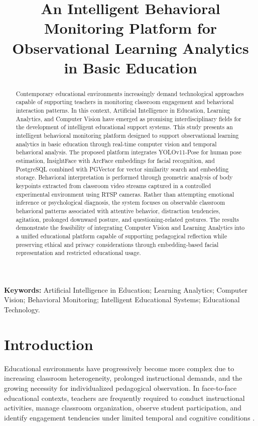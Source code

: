 \documentclass[12pt,a4paper]{article}
\title{An Intelligent Behavioral Monitoring Platform for Observational Learning Analytics in Basic Education}
\author{}
\date{}
\begin{document}
\maketitle

\begin{abstract}
Contemporary educational environments increasingly demand technological approaches capable of supporting teachers in monitoring classroom engagement and behavioral interaction patterns. In this context, Artificial Intelligence in Education, Learning Analytics, and Computer Vision have emerged as promising interdisciplinary fields for the development of intelligent educational support systems. This study presents an intelligent behavioral monitoring platform designed to support observational learning analytics in basic education through real-time computer vision and temporal behavioral analysis. The proposed platform integrates YOLOv11-Pose \cite{zhuCsbyoloRapidEfficient2024} for human pose estimation, InsightFace with ArcFace embeddings for facial recognition, and PostgreSQL combined with PGVector for vector similarity search and embedding storage. Behavioral interpretation is performed through geometric analysis of body keypoints extracted from classroom video streams captured in a controlled experimental environment using RTSP cameras. Rather than attempting emotional inference or psychological diagnosis, the system focuses on observable classroom behavioral patterns associated with attentive behavior, distraction tendencies, agitation, prolonged downward posture, and questioning-related gestures. The results demonstrate the feasibility of integrating Computer Vision and Learning Analytics into a unified educational platform capable of supporting pedagogical reflection while preserving ethical and privacy considerations through embedding-based facial representation and restricted educational usage.
\end{abstract}

\noindent\textbf{Keywords:} Artificial Intelligence in Education; Learning Analytics; Computer Vision; Behavioral Monitoring; Intelligent Educational Systems; Educational Technology.

\section{Introduction}

Educational environments have progressively become more complex due to increasing classroom heterogeneity, prolonged instructional demands, and the growing necessity for individualized pedagogical observation. In face-to-face educational contexts, teachers are frequently required to conduct instructional activities, manage classroom organization, observe student participation, and identify engagement tendencies under limited temporal and cognitive conditions \cite{trabelsiRealTimeAttentionMonitoring2023a,yuvarajAutomatedRecognitionTeacher2024,zhangSmartClassroomsHow2024}.
\end{document}
